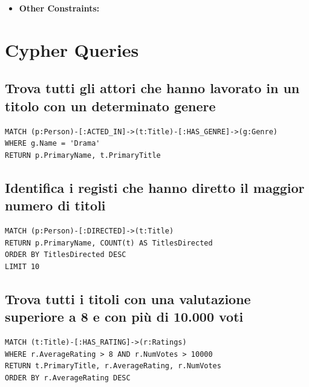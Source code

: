 \documentclass[a4paper,12pt]{article}
\begin{document}
\begin{itemize}[noitemsep]
   \item \textbf{Other Constraints:}
   \begin{itemize}
   \end{itemize}
\end{itemize}

\section{Cypher Queries}
\subsection{Trova tutti gli attori che hanno lavorato in un titolo con un determinato genere}
\begin{verbatim}
MATCH (p:Person)-[:ACTED_IN]->(t:Title)-[:HAS_GENRE]->(g:Genre)
WHERE g.Name = 'Drama'
RETURN p.PrimaryName, t.PrimaryTitle
\end{verbatim}

\subsection{Identifica i registi che hanno diretto il maggior numero di titoli}
\begin{verbatim}
MATCH (p:Person)-[:DIRECTED]->(t:Title)
RETURN p.PrimaryName, COUNT(t) AS TitlesDirected
ORDER BY TitlesDirected DESC
LIMIT 10
\end{verbatim}

\subsection{Trova tutti i titoli con una valutazione superiore a 8 e con più di 10.000 voti}
\begin{verbatim}
MATCH (t:Title)-[:HAS_RATING]->(r:Ratings)
WHERE r.AverageRating > 8 AND r.NumVotes > 10000
RETURN t.PrimaryTitle, r.AverageRating, r.NumVotes
ORDER BY r.AverageRating DESC
\end{verbatim}
\end{document}
